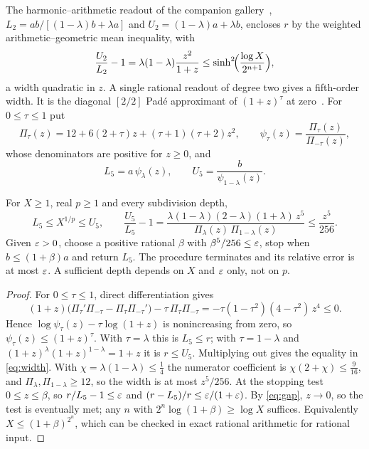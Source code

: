 The harmonic--arithmetic readout of the companion gallery~\cite{gallery},
$L_2=ab/[(1-\lambda)b+\lambda a]$ and $U_2=(1-\lambda)a+\lambda b$, encloses $r$ by the weighted
arithmetic--geometric mean inequality, with
\[ \frac{U_2}{L_2}-1=\lambda(1-\lambda)\frac{z^{2}}{1+z}\le\sinh^{2}\!\Bigl(\frac{\log X}{2^{n+1}}\Bigr), \]
a width quadratic in $z$. A single rational readout of degree two gives a fifth-order width. It is the
diagonal $[2/2]$ Pad\'e approximant of $(1+z)^{\tau}$ at zero~\cite{dlmf,baker}. For $0\le\tau\le1$ put
\begin{equation}\label{eq:pade}
\Pi_\tau(z)=12+6(2+\tau)z+(\tau+1)(\tau+2)z^{2},\qquad
\psi_\tau(z)=\frac{\Pi_\tau(z)}{\Pi_{-\tau}(z)},
\end{equation}
whose denominators are positive for $z\ge0$, and
\begin{equation}\label{eq:L5}
L_5=a\,\psi_\lambda(z),\qquad U_5=\frac{b}{\psi_{1-\lambda}(z)}.
\end{equation}

\begin{proposition}\label{prop:enclosure}
For $X\ge1$, real $p\ge1$ and every subdivision depth,
\begin{equation}\label{eq:width}
L_5\le X^{1/p}\le U_5,\qquad
\frac{U_5}{L_5}-1=\frac{\lambda(1-\lambda)(2-\lambda)(1+\lambda)\,z^{5}}{\Pi_\lambda(z)\,\Pi_{1-\lambda}(z)}
\le\frac{z^{5}}{256}.
\end{equation}
Given $\varepsilon>0$, choose a positive rational $\beta$ with $\beta^{5}/256\le\varepsilon$, stop when
$b\le(1+\beta)a$ and return $L_5$. The procedure terminates and its relative error is at most $\varepsilon$.
A sufficient depth depends on $X$ and $\varepsilon$ only, not on $p$.
\end{proposition}
\begin{proof}
For $0\le\tau\le1$, direct differentiation gives
\[ (1+z)\bigl(\Pi_\tau'\Pi_{-\tau}-\Pi_\tau\Pi_{-\tau}'\bigr)-\tau\,\Pi_\tau\Pi_{-\tau}
=-\tau(1-\tau^{2})(4-\tau^{2})\,z^{4}\le0. \]
Hence $\log\psi_\tau(z)-\tau\log(1+z)$ is nonincreasing from zero, so
$\psi_\tau(z)\le(1+z)^{\tau}$. With $\tau=\lambda$ this is $L_5\le r$; with $\tau=1-\lambda$ and
$(1+z)^{\lambda}(1+z)^{1-\lambda}=1+z$ it is $r\le U_5$. Multiplying out gives the equality in
\eqref{eq:width}. With $\chi=\lambda(1-\lambda)\le\tfrac14$ the numerator coefficient is
$\chi(2+\chi)\le\tfrac9{16}$, and $\Pi_\lambda,\Pi_{1-\lambda}\ge12$, so the width is at most
$z^{5}/256$. At the stopping test $0\le z\le\beta$, so $r/L_5-1\le\varepsilon$ and $(r-L_5)/r\le\varepsilon/(1+\varepsilon)$.
By \eqref{eq:gap}, $z\to0$, so the test is eventually met; any $n$ with $2^{n}\log(1+\beta)\ge\log X$
suffices. Equivalently $X\le(1+\beta)^{2^{n}}$, which can be checked in exact rational arithmetic for
rational input.
\end{proof}

